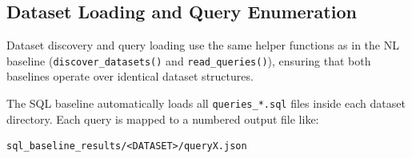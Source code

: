 \documentclass[12pt]{article}
\begin{document}
\begin{table}[h]
\centering
{}
\caption{constrained prompting with watsonx model}
\end{table}

\begin{table}[h]
\centering
{}
\caption{hidden\_cot prompting with watsonx model}
\end{table}

\begin{table}[h]
\centering
{}
\caption{fewshot prompting with watsonx model}
\end{table}

\subsection{Dataset Loading and Query Enumeration}

Dataset discovery and query loading use the same helper functions as in the NL baseline 
(\texttt{discover\_datasets()} and \texttt{read\_queries()}), ensuring that both baselines 
operate over identical dataset structures.

The SQL baseline automatically loads all \texttt{queries\_*.sql} files inside each dataset directory.  
Each query is mapped to a numbered output file like:

\begin{verbatim}
sql_baseline_results/<DATASET>/queryX.json
\end{verbatim}
\end{document}
